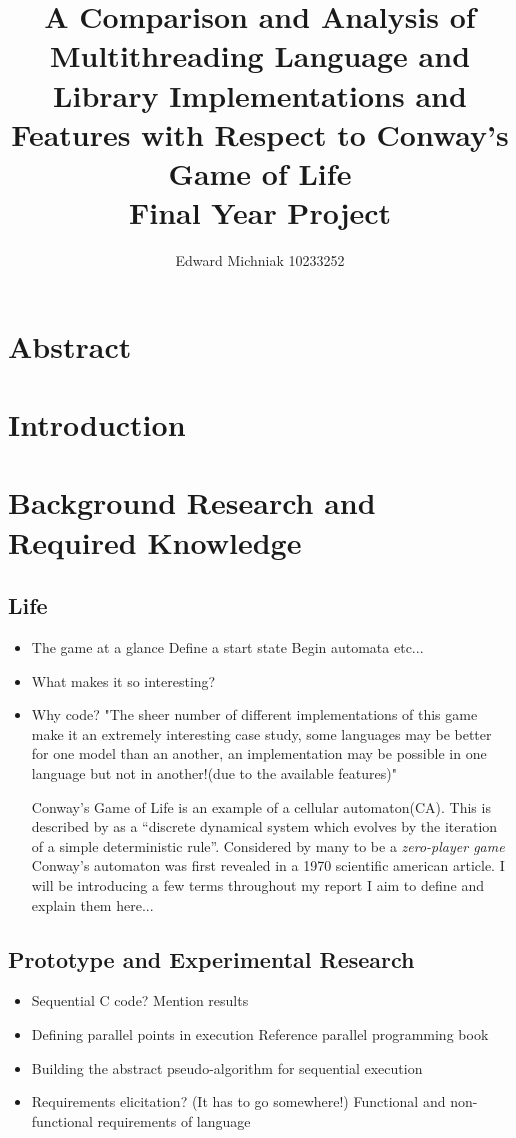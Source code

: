 \documentclass[11pt]{article} %
\title{A Comparison and Analysis of Multithreading Language and Library Implementations and Features with Respect to Conway's Game of Life\\Final Year Project}
\author{Edward Michniak 10233252}
\date{} %
\begin{document}
\maketitle
\tableofcontents
\pagebreak
\section{Abstract}
\section{Introduction}
\section{Background Research and Required Knowledge}
\subsection{Life}
\begin{itemize}
\item The game at a glance
\subitem Define a start state
\subitem Begin automata etc...
\item What makes it so interesting?
\item Why code?
\subitem "The sheer number of different implementations of this game make it an extremely interesting case study, some languages may be better for one model than an another, an implementation may be possible in one language but not in another!(due to the available features)"

Conway's Game of Life is an example of a cellular automaton(CA). This is described by \cite[Lesser, Wuensche, 1992 p6]{ref6} as a ``discrete dynamical system which evolves by the iteration of a simple deterministic rule''. Considered by many to be a \emph{zero-player game} Conway's automaton was first revealed in a 1970 scientific american article.\cite[Gardner]{ref7} I will be introducing a few terms throughout my report I aim to define and explain them here...

\end{itemize}
\subsection{Prototype and Experimental Research}
\begin{itemize}
\item Sequential C code?
\subitem Mention results
\item Defining parallel points in execution 
\subitem Reference parallel programming book
\item Building the abstract pseudo-algorithm for sequential execution
\item Requirements elicitation? (It has to go somewhere!)
\subitem Functional and non-functional requirements of language
\end{itemize}
\end{document}
